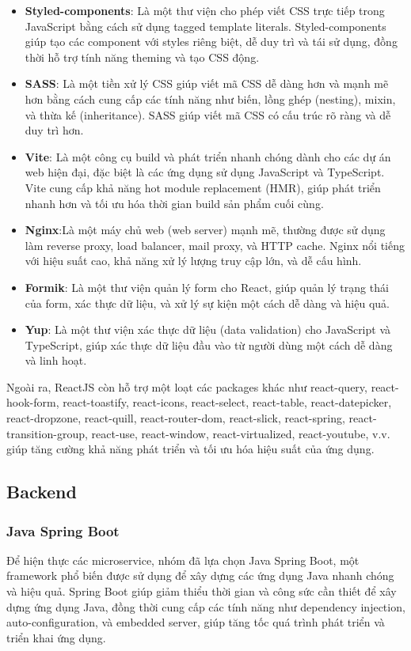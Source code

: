 \begin{itemize}
    \item \textbf{Styled-components}: Là một thư viện cho phép viết CSS trực tiếp trong JavaScript bằng cách sử dụng tagged template literals. Styled-components giúp tạo các component với styles riêng biệt, dễ duy trì và tái sử dụng, đồng thời hỗ trợ tính năng theming và tạo CSS động.
    \item \textbf{SASS}: Là một tiền xử lý CSS giúp viết mã CSS dễ dàng hơn và mạnh mẽ hơn bằng cách cung cấp các tính năng như biến, lồng ghép (nesting), mixin, và thừa kế (inheritance). SASS giúp viết mã CSS có cấu trúc rõ ràng và dễ duy trì hơn.
    \item \textbf{Vite}: Là một công cụ build và phát triển nhanh chóng dành cho các dự án web hiện đại, đặc biệt là các ứng dụng sử dụng JavaScript và TypeScript. Vite cung cấp khả năng hot module replacement (HMR), giúp phát triển nhanh hơn và tối ưu hóa thời gian build sản phẩm cuối cùng.
    \item \textbf{Nginx}:Là một máy chủ web (web server) mạnh mẽ, thường được sử dụng làm reverse proxy, load balancer, mail proxy, và HTTP cache. Nginx nổi tiếng với hiệu suất cao, khả năng xử lý lượng truy cập lớn, và dễ cấu hình.
    \item \textbf{Formik}: Là một thư viện quản lý form cho React, giúp quản lý trạng thái của form, xác thực dữ liệu, và xử lý sự kiện một cách dễ dàng và hiệu quả.
    \item \textbf{Yup}: Là một thư viện xác thực dữ liệu (data validation) cho JavaScript và TypeScript, giúp xác thực dữ liệu đầu vào từ người dùng một cách dễ dàng và linh hoạt.
\end{itemize}
\noindent Ngoài ra, ReactJS còn hỗ trợ một loạt các packages khác như react-query, react-hook-form, react-toastify, react-icons, react-select, react-table, react-datepicker, react-dropzone, react-quill, react-router-dom, react-slick, react-spring, react-transition-group, react-use, react-window, react-virtualized, react-youtube, v.v. giúp tăng cường khả năng phát triển và tối ưu hóa hiệu suất của ứng dụng.
\subsection{Backend}
\subsubsection{Java Spring Boot}
\noindent Để hiện thực các microservice, nhóm đã lựa chọn Java Spring Boot, một framework phổ biến được sử dụng để xây dựng các ứng dụng Java nhanh chóng và hiệu quả. Spring Boot giúp giảm thiểu thời gian và công sức cần thiết để xây dựng ứng dụng Java, đồng thời cung cấp các tính năng như dependency injection, auto-configuration, và embedded server, giúp tăng tốc quá trình phát triển và triển khai ứng dụng.

